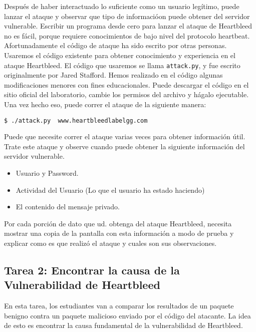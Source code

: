 Después de haber interactuado lo suficiente como un usuario legítimo, puede lanzar el ataque y observar que tipo de informacióon puede obtener del servidor vulnerable.
Escribir un programa desde cero para lanzar el ataque de Heartbleed no es fácil, porque requiere conocimientos de bajo nivel del protocolo heartbeat. Afortunadamente el código de ataque ha sido escrito por otras personas. Usaremos el código existente para obtener conocimiento y experiencia en el ataque Heartbleed.
El código que usaremos se llama \texttt{attack.py}, y fue escrito originalmente por Jared Stafford.
Hemos realizado en el código algunas modificaciones menores con fines educacionales.
Puede descargar el código en el sitio oficial del laboratorio, cambie los permisos del archivo y hágalo ejecutable. Una vez hecho eso, puede correr el ataque de la siguiente manera:

\begin{lstlisting}
$ ./attack.py  www.heartbleedlabelgg.com
\end{lstlisting}

Puede que necesite correr el ataque varias veces para obtener información útil.
Trate este ataque y observe cuando puede obtener la siguiente información del servidor vulnerable.
 

\begin{itemize} 
	\item Usuario y Password.
	\item Actividad del Usuario (Lo que el usuario ha estado haciendo)
	\item El contenido del mensaje privado.
\end{itemize} 
  
Por cada porción de dato que ud. obtenga del ataque Heartbleed, necesita mostrar una copia de la pantalla con esta información a modo de prueba y explicar como es que realizó el ataque y cuales son sus observaciones.



\subsection{Tarea 2: Encontrar la causa de la Vulnerabilidad de Heartbleed}

En esta tarea, los estudiantes van a comparar los resultados de un paquete benigno contra un paquete malicioso enviado por el código del atacante. La idea de esto es encontrar la causa fundamental de la vulnerabilidad de Heartbleed.

